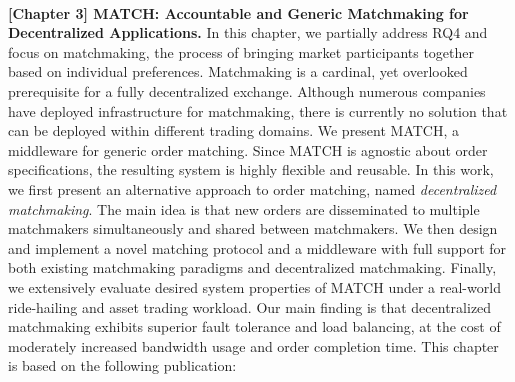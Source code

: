 \\

\textbf{[Chapter 3] MATCH: Accountable and Generic Matchmaking for Decentralized Applications.}
In this chapter, we partially address RQ4 and focus on matchmaking, the process of bringing market participants together based on individual preferences.
Matchmaking is a cardinal, yet overlooked prerequisite for a fully decentralized exchange.
Although numerous companies have deployed infrastructure for matchmaking, there is currently no solution that can be deployed within different trading domains.
We present MATCH, a middleware for generic order matching.
Since MATCH is agnostic about order specifications, the resulting system is highly flexible and reusable.
In this work, we first present an alternative approach to order matching, named \emph{decentralized matchmaking}.
The main idea is that new orders are disseminated to multiple matchmakers simultaneously and shared between matchmakers.
We then design and implement a novel matching protocol and a middleware with full support for both existing matchmaking paradigms and decentralized matchmaking.
Finally, we extensively evaluate desired system properties of MATCH under a real-world ride-hailing and asset trading workload.
Our main finding is that decentralized matchmaking exhibits superior fault tolerance and load balancing, at the cost of moderately increased bandwidth usage and order completion time.
This chapter is based on the following publication:

\\

